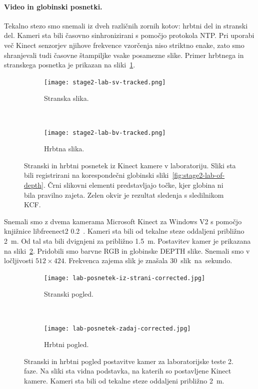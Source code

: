 \paragraph{Video in globinski posnetki.}
Tekalno stezo smo snemali iz dveh različnih zornih kotov: hrbtni del in stranski del. Kameri sta bili časovno sinhronizirani s pomočjo protokola NTP. Pri uporabi več Kinect senzorjev njihove frekvence vzorčenja niso striktno enake, zato smo shranjevali tudi časovne štampiljke vsake posamezne slike. Primer hrbtnega in stranskega posnetka je prikazan na sliki~\ref{fig:primer-posnetka-stage2}.

\begin{figure}[!htb]
	\centering
	\begin{subfigure}{0.45\columnwidth}
		\texttt{[image: stage2-lab-sv-tracked.png]}
		\caption{Stranska slika.}
	\end{subfigure}
	~
	\begin{subfigure}{0.45\columnwidth}
		\texttt{[image: stage2-lab-bv-tracked.png]}
		\caption{Hrbtna slika.}
	\end{subfigure}
	\caption[Stranski in hrbtni posnetek iz Kinect kamere v laboratoriju]{Stranski in hrbtni posnetek iz Kinect kamere v laboratoriju. Sliki sta bili registrirani na korespondečni globinski sliki~\ref{fig:stage2-lab-of-depth}. Črni slikovni elementi predstavljajo točke, kjer globina ni bila pravilno zajeta. Zelen okvir je rezultat sledenja s  sledilnikom KCF.}
	\label{fig:primer-posnetka-stage2}
\end{figure}

Snemali smo z dvema kamerama Microsoft Kinect za Windows V2 s pomočjo knjižnice libfreenect2 0.2~\cite{lingzhu2016libfreenect2}. Kameri sta bili od tekalne steze oddaljeni približno \SI{2}{m}. Od tal sta bili dvignjeni za približno \SI{1.5}{m}. Postavitev kamer je prikazana na sliki~\ref{fig:lab-postavitev-kamer}. Pridobili smo barvne RGB in globinske DEPTH slike. Snemali smo v ločljivosti $512 \times 424$. Frekvenca zajema slik je znašala \SI{30} slik na sekundo.

\begin{figure}[!htb]
	\centering
	\begin{subfigure}[t]{0.45\columnwidth}
		\texttt{[image: lab-posnetek-iz-strani-corrected.jpg]}
		\caption{Stranski pogled.}
	\end{subfigure}
	~
	\begin{subfigure}[t]{0.45\columnwidth}
		\texttt{[image: lab-posnetek-zadaj-corrected.jpg]}
		\caption{Hrbtni pogled.}
	\end{subfigure}
	\caption[Stranski in hrbtni pogled izvajanja lab. testov 2. faze]{Stranski in hrbtni pogled postavitve kamer za laboratorijske teste 2. faze. Na sliki sta vidna podstavka, na katerih so postavljene Kinect kamere. Kameri sta bili od tekalne steze oddaljeni približno \SI{2}{m}.}
	\label{fig:lab-postavitev-kamer}
\end{figure}


